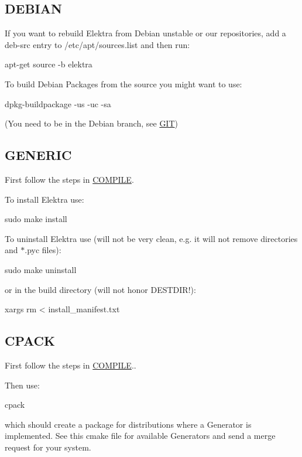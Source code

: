 \subsection*{D\+E\+B\+I\+A\+N}

If you want to rebuild Elektra from Debian unstable or our repositories, add a {\ttfamily deb-\/src} entry to {\ttfamily /etc/apt/sources.list} and then run\+: \begin{DoxyVerb}    apt-get source -b elektra
\end{DoxyVerb}


To build Debian Packages from the source you might want to use\+: \begin{DoxyVerb}    dpkg-buildpackage -us -uc -sa
\end{DoxyVerb}


(You need to be in the Debian branch, see \hyperlink{doc_GIT_md}{G\+I\+T})

\subsection*{G\+E\+N\+E\+R\+I\+C}

First follow the steps in \hyperlink{doc_COMPILE_md}{C\+O\+M\+P\+I\+L\+E}.

To install Elektra use\+: \begin{DoxyVerb}    sudo make install
\end{DoxyVerb}


To uninstall Elektra use (will not be very clean, e.\+g. it will not remove directories and $\ast$.pyc files)\+: \begin{DoxyVerb}    sudo make uninstall
\end{DoxyVerb}


or in the build directory (will not honor D\+E\+S\+T\+D\+I\+R!)\+: \begin{DoxyVerb}    xargs rm < install_manifest.txt
\end{DoxyVerb}


\subsection*{C\+P\+A\+C\+K}

First follow the steps in \hyperlink{doc_COMPILE_md}{C\+O\+M\+P\+I\+L\+E}..

Then use\+: \begin{DoxyVerb}    cpack
\end{DoxyVerb}


which should create a package for distributions where a Generator is implemented. See this cmake file for available Generators and send a merge request for your system.

